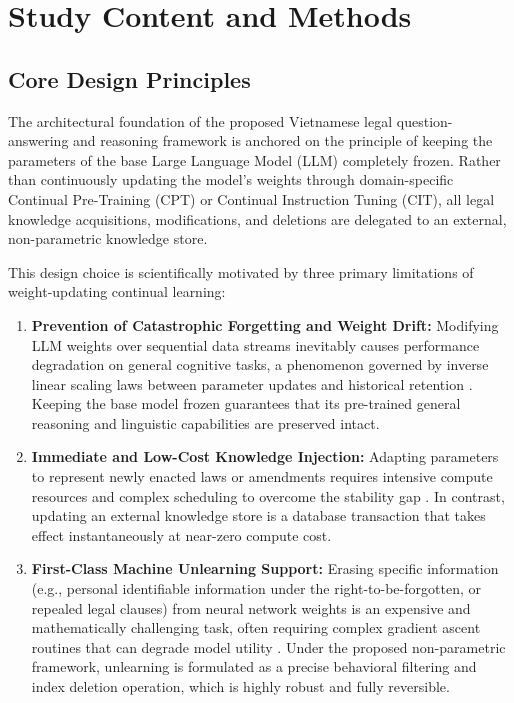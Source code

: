 \section{Study Content and Methods}

\subsection{Core Design Principles}
The architectural foundation of the proposed Vietnamese legal question-answering and reasoning framework is anchored on the principle of keeping the parameters of the base Large Language Model (LLM) completely frozen. Rather than continuously updating the model's weights through domain-specific Continual Pre-Training (CPT) or Continual Instruction Tuning (CIT), all legal knowledge acquisitions, modifications, and deletions are delegated to an external, non-parametric knowledge store. 

This design choice is scientifically motivated by three primary limitations of weight-updating continual learning:
\begin{enumerate}
    \item \textbf{Prevention of Catastrophic Forgetting and Weight Drift:} Modifying LLM weights over sequential data streams inevitably causes performance degradation on general cognitive tasks, a phenomenon governed by inverse linear scaling laws between parameter updates and historical retention \parencite{kalajdzievski2024scalinglawsforgettingfinetuning, li2024revisitingcatastrophicforgettinglarge}. Keeping the base model frozen guarantees that its pre-trained general reasoning and linguistic capabilities are preserved intact.
    \item \textbf{Immediate and Low-Cost Knowledge Injection:} Adapting parameters to represent newly enacted laws or amendments requires intensive compute resources and complex scheduling to overcome the stability gap \parencite{gupta2023continualpretraininglargelanguage, guo2024efficientcontinualpretrainingmitigating}. In contrast, updating an external knowledge store is a database transaction that takes effect instantaneously at near-zero compute cost.
    \newpage
    \item \textbf{First-Class Machine Unlearning Support:} Erasing specific information (e.g., personal identifiable information under the right-to-be-forgotten, or repealed legal clauses) from neural network weights is an expensive and mathematically challenging task, often requiring complex gradient ascent routines that can degrade model utility \parencite{11207222}. Under the proposed non-parametric framework, unlearning is formulated as a precise behavioral filtering and index deletion operation, which is highly robust and fully reversible.
\end{enumerate}

